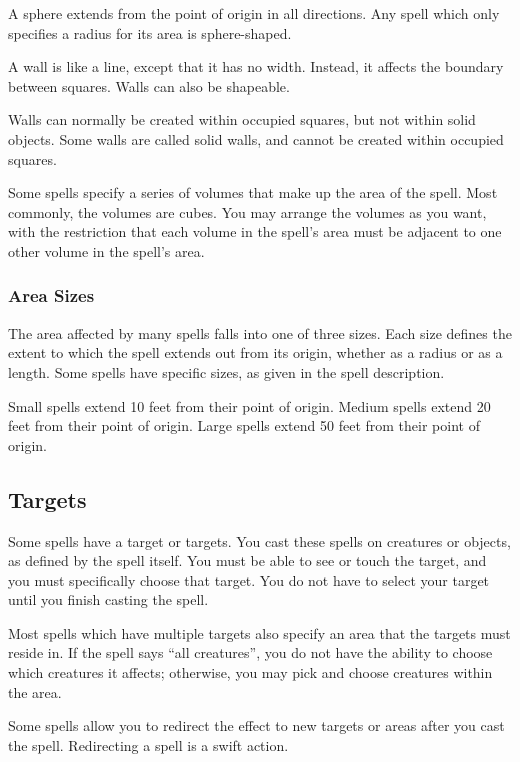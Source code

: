  A sphere extends from the point of origin in all directions. Any spell which only specifies a radius for its area is sphere-shaped.

 A wall is like a line, except that it has no width. Instead, it affects the boundary between squares. Walls can also be shapeable.

Walls can normally be created within occupied squares, but not within solid objects. Some walls are called solid walls, and cannot be created within occupied squares.

 Some spells specify a series of volumes that make up the area of the spell. Most commonly, the volumes are cubes. You may arrange the volumes as you want, with the restriction that each volume in the spell's area must be adjacent to one other volume in the spell's area.

\subsubsection{Area Sizes}

The area affected by many spells falls into one of three sizes. Each size defines the extent to which the spell extends out from its origin, whether as a radius or as a length. Some spells have specific sizes, as given in the spell description.

 Small spells extend 10 feet from their point of origin.
 Medium spells extend 20 feet from their point of origin.
 Large spells extend 50 feet from their point of origin.

\subsection{Targets}
Some spells have a target or targets. You cast these spells on creatures or objects, as defined by the spell itself. You must be able to see or touch the target, and you must specifically choose that target. You do not have to select your target until you finish casting the spell.

 Most spells which have multiple targets also specify an area that the targets must reside in. If the spell says ``all creatures'', you do not have the ability to choose which creatures it affects; otherwise, you may pick and choose creatures within the area.

 Some spells allow you to redirect the effect to new targets or areas after you cast the spell. Redirecting a spell is a swift action.

